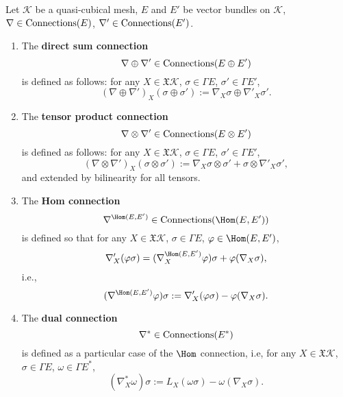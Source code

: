 \begin{definition}
  Let
    $\mathcal{K}$ be a quasi-cubical mesh,
    $E$ and $E'$ be vector bundles on $\mathcal{K}$,
    $\nabla \in \mathop{\rm Connections}\nolimits(E)$,
    $\nabla' \in \mathop{\rm Connections}\nolimits(E')$.
  \begin{enumerate}
    \item 
      The \textbf{direct sum connection}
      \begin{equation}
        \nabla \oplus \nabla' \in \mathop{\rm Connections}\nolimits(E \oplus E')
      \end{equation}
      is defined as follows: for any $X \in \mathfrak{X} \mathcal{K}$,
      $\sigma \in \Gamma E$, $\sigma' \in \Gamma E'$,
      \begin{equation}
        (\nabla \oplus \nabla')_X (\sigma \oplus \sigma')
        := \nabla_X \sigma \oplus \nabla'_X \sigma'.
      \end{equation}
    \item
      The \textbf{tensor product connection}
      \begin{equation}
        \nabla \otimes \nabla' \in \mathop{\rm Connections}\nolimits(E \otimes E')
      \end{equation}
      is defined as follows: for any $X \in \mathfrak{X} \mathcal{K}$,
      $\sigma \in \Gamma E$, $\sigma' \in \Gamma E'$,
      \begin{equation}
        (\nabla \otimes \nabla')_X (\sigma \otimes \sigma')
        := \nabla_X \sigma \otimes \sigma' + \sigma \otimes \nabla'_X \sigma',
      \end{equation}
      and extended by bilinearity for all tensors.
    \item
      The \textbf{Hom connection}
      \begin{equation}
        \nabla^{\Hom(E, E')} \in \Connections(\Hom(E, E'))
      \end{equation}
      is defined so that for any $X \in \mathfrak{X} \mathcal{K}$,
      $\sigma \in \Gamma E$, $\varphi \in \Hom(E, E')$,
      \begin{equation}
        \nabla'_X(\varphi \sigma)
        = (\nabla^{\Hom(E, E')}_X \varphi) \sigma + \varphi(\nabla_X \sigma),
      \end{equation}
      i.e.,
      \begin{equation}
        (\nabla^{\Hom(E, E')} \varphi) \sigma
        := \nabla'_X(\varphi \sigma) - \varphi(\nabla_X \sigma).
      \end{equation}
    \item
      The \textbf{dual connection}
      \begin{equation}
        \nabla^* \in \mathop{\rm Connections}\nolimits(E^*)
      \end{equation}
      is defined as a particular case of the $\Hom$ connection, i.e,
      for any $X \in \mathfrak{X} \mathcal{K}$,
      $\sigma \in \Gamma E$, $\omega \in \Gamma E^*$,
      \begin{equation}
        (\nabla^*_X \omega) \sigma
        := L_X(\omega \sigma) - \omega(\nabla_X \sigma).
      \end{equation}
  \end{enumerate}
\end{definition}
